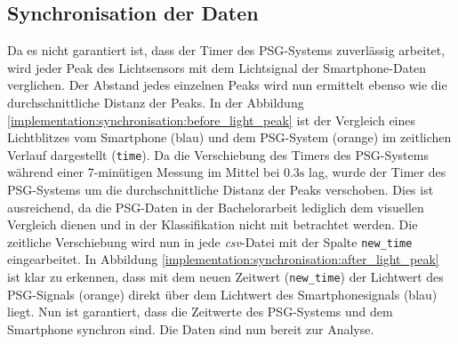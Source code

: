 \subsection{Synchronisation der Daten}
\label{ch:Implementierung:data_sync}
Da es nicht garantiert ist, dass der Timer des PSG-Systems zuverlässig arbeitet, wird jeder Peak des Lichtsensors mit dem Lichtsignal der Smartphone-Daten verglichen.
Der Abstand jedes einzelnen Peaks wird nun ermittelt ebenso wie die durchschnittliche Distanz der Peaks.
In der Abbildung \ref{implementation:synchronisation:before_light_peak} ist der Vergleich eines Lichtblitzes vom Smartphone (blau) und dem PSG-System (orange) im zeitlichen Verlauf dargestellt (\texttt{time}).
Da die Verschiebung des Timers des PSG-Systems während einer 7-minütigen Messung im Mittel bei $0.3\si{\s}$ lag, wurde der Timer des PSG-Systems um die durchschnittliche Distanz der Peaks verschoben.
Dies ist ausreichend, da die PSG-Daten in der Bachelorarbeit lediglich dem visuellen Vergleich dienen und in der Klassifikation nicht mit betrachtet werden. 
Die zeitliche Verschiebung wird nun in jede \textit{csv}-Datei mit der Spalte \texttt{new\_time} eingearbeitet.
In Abbildung \ref{implementation:synchronisation:after_light_peak} ist klar zu erkennen, dass mit dem neuen Zeitwert (\texttt{new\_time}) der Lichtwert des PSG-Signals (orange) direkt über dem Lichtwert des Smartphonesignals (blau) liegt.
Nun ist garantiert, dass die Zeitwerte des PSG-Systems und dem Smartphone synchron sind. Die Daten sind nun bereit zur Analyse.

